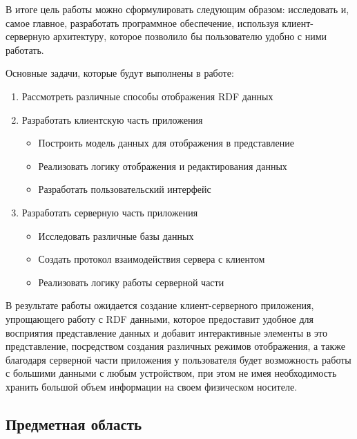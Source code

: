 \documentclass[12pt]{article}
\begin{document}
В итоге цель работы можно сформулировать следующим образом: исследовать и, самое главное, разработать программное обеспечение, используя клиент-серверную архитектуру, которое позволило бы пользователю удобно с ними работать.\par

Основные задачи, которые будут выполнены в работе:
\begin{enumerate}
    \item Рассмотреть различные способы отображения RDF данных
    \item Разработать клиентскую часть приложения
          \begin{itemize}
              \item Построить модель данных для отображения в представление
              \item Реализовать логику отображения и редактирования данных
              \item Разработать пользовательский интерфейс
          \end{itemize}
    \item Разработать серверную часть приложения
          \begin{itemize}
              \item Исследовать различные базы данных
              \item Создать протокол взаимодействия сервера с клиентом
              \item Реализовать логику работы серверной части
          \end{itemize}
\end{enumerate}

В результате работы ожидается создание клиент-серверного приложения, упрощающего работу с RDF данными, которое предоставит удобное для восприятия представление данных и добавит интерактивные элементы в это представление, посредством создания различных режимов отображения, а также благодаря серверной части приложения у пользователя будет возможность работы с большими данными с любым устройством, при этом не имея необходимость хранить большой объем информации на своем физическом носителе.

\pagebreak

\sectionfont{\bfseries\Large}
\subsectionfont{\RaggedRight}
\begin{center}
    {\section{Предметная область}}
\end{center}
\end{document}
